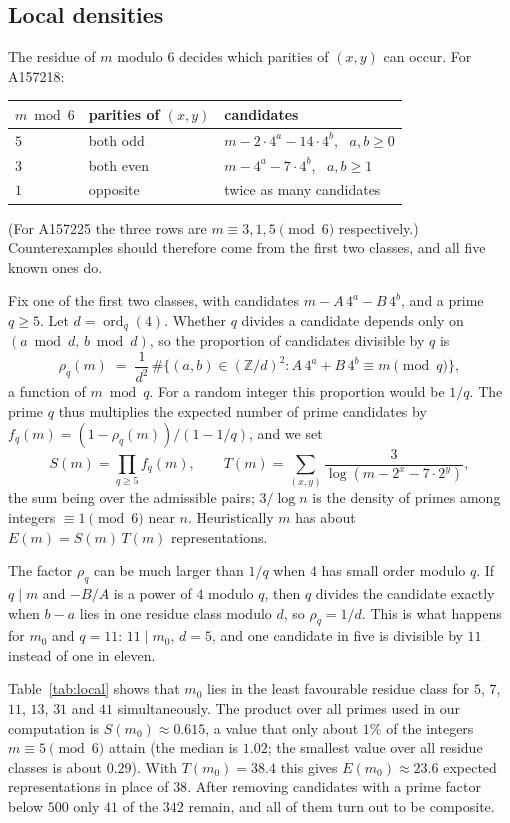 \documentclass[11pt]{article}
\theoremstyle{definition}
\theoremstyle{remark}
\newcommand{\mz}{m_0}
\newcommand{\ord}{\operatorname{ord}}
\begin{document}
\subsection{Local densities}
The residue of $m$ modulo $6$ decides which parities of $(x,y)$ can occur. For A157218:
\begin{center}
\begin{tabular}{lll}
\toprule
$m \bmod 6$ & parities of $(x,y)$ & candidates \\
\midrule
$5$ & both odd & $m-2\cdot 4^a-14\cdot 4^b$, \ $a,b\ge 0$ \\
$3$ & both even & $m-4^a-7\cdot 4^b$, \ $a,b\ge 1$ \\
$1$ & opposite & twice as many candidates \\
\bottomrule
\end{tabular}
\end{center}
(For A157225 the three rows are $m\equiv 3,1,5 \pmod 6$ respectively.) Counterexamples should
therefore come from the first two classes, and all five known ones do.

Fix one of the first two classes, with candidates $m-A\,4^a-B\,4^b$, and a prime $q\ge 5$. Let
$d=\ord_q(4)$. Whether $q$ divides a candidate depends only on $(a \bmod d,\, b\bmod d)$, so the
proportion of candidates divisible by $q$ is
\[
  \rho_q(m) \;=\; \frac{1}{d^{2}}\,\#\bigl\{(a,b)\in(\mathbb Z/d)^2 : A\,4^a+B\,4^b\equiv m \pmod q\bigr\},
\]
a function of $m \bmod q$. For a random integer this proportion would be $1/q$. The prime $q$ thus
multiplies the expected number of prime candidates by $f_q(m)=(1-\rho_q(m))/(1-1/q)$, and we set
\[
   S(m)=\prod_{q\ge 5} f_q(m),\qquad T(m)=\sum_{(x,y)}\frac{3}{\log(m-2^x-7\cdot 2^y)},
\]
the sum being over the admissible pairs; $3/\log n$ is the density of primes among integers
$\equiv 1\pmod 6$ near $n$. Heuristically $m$ has about $E(m)=S(m)\,T(m)$ representations.

The factor $\rho_q$ can be much larger than $1/q$ when $4$ has small order modulo $q$. If $q\mid m$
and $-B/A$ is a power of $4$ modulo $q$, then $q$ divides the candidate exactly when $b-a$ lies in
one residue class modulo $d$, so $\rho_q=1/d$. This is what happens for $\mz$ and $q=11$:
$11\mid \mz$, $d=5$, and one candidate in five is divisible by $11$ instead of one in eleven.

Table~\ref{tab:local} shows that $\mz$ lies in the least favourable residue class for $5$, $7$,
$11$, $13$, $31$ and $41$ simultaneously. The product over all primes used in our computation is
$S(\mz)\approx 0.615$, a value that only about $1\%$ of the integers $m\equiv 5\pmod 6$ attain
(the median is $1.02$; the smallest value over all residue classes is about $0.29$). With
$T(\mz)=38.4$ this gives $E(\mz)\approx 23.6$ expected representations in place of $38$. After
removing candidates with a prime factor below $500$ only $41$ of the $342$ remain, and all of them
turn out to be composite.
\end{document}
